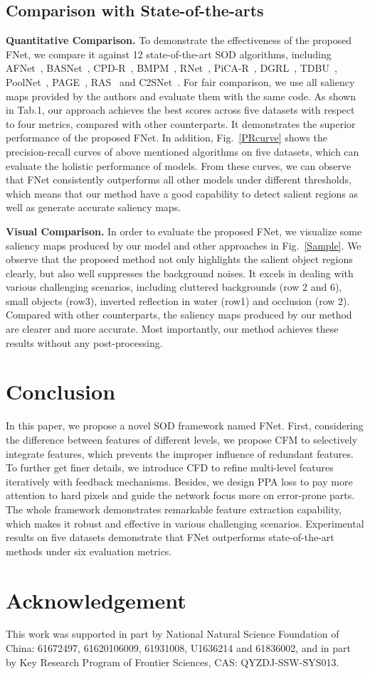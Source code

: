 \documentclass[letterpaper]{article} \usepackage{aaai20}  \usepackage{times}  \usepackage{helvet} \usepackage{courier}  \usepackage[hyphens]{url}  \usepackage{graphicx} \urlstyle{rm} \def\UrlFont{\rm}  \usepackage{graphicx}  \frenchspacing  \setlength{\pdfpagewidth}{8.5in}  \setlength{\pdfpageheight}{11in}
\begin{document}
\subsection{Comparison with State-of-the-arts}
\textbf{Quantitative Comparison.}
To demonstrate the effectiveness of the proposed FNet, we compare it against 12 state-of-the-art SOD algorithms, including AFNet~\cite{AFNet}, BASNet~\cite{BASNet}, CPD-R~\cite{CPD}, BMPM~\cite{BMPM}, RNet~\cite{R3Net}, PiCA-R~\cite{PiCANet}, DGRL~\cite{DGRL}, TDBU~\cite{TDBU}, PoolNet~\cite{PoolNet}, PAGE~\cite{PAGE}, RAS~\cite{RAS} and C2SNet~\cite{C2SNet}. For fair comparison, we use all saliency maps provided by the authors and evaluate them with the same code. As shown in Tab.1, our approach achieves the best scores across five datasets with respect to four metrics, compared with other counterparts. It demonstrates the superior performance of the proposed FNet. In addition, Fig.~\ref{PRcurve} shows the precision-recall curves of above mentioned algorithms on five datasets, which can evaluate the holistic performance of models. From these curves, we can observe that FNet consistently outperforms all other models under different thresholds, which means that our method have a good capability to detect salient regions as well as generate accurate saliency maps.

\textbf{Visual Comparison.}
In order to evaluate the proposed FNet, we visualize some saliency maps produced by our model and other approaches in Fig.~\ref{Sample}. We observe that the proposed method not only highlights the salient object regions clearly, but also well suppresses the background noises. It excels in dealing with various challenging scenarios, including cluttered backgrounds (row 2 and 6), small objects (row3), inverted reflection in water (row1) and occlusion (row 2). Compared with other counterparts, the saliency maps produced by our method are clearer and more accurate. Most importantly, our method achieves these results without any post-processing.

\section{Conclusion}
In this paper, we propose a novel SOD framework named FNet. First, considering the difference between features of different levels, we propose CFM to selectively integrate features, which prevents the improper influence of redundant features. To further get finer details, we introduce CFD to refine multi-level features iteratively with feedback mechanisms. Besides, we design PPA loss to pay more attention to hard pixels and guide the network focus more on error-prone parts. The whole framework demonstrates remarkable feature extraction capability, which makes it robust and effective in various challenging scenarios. Experimental results on five datasets demonstrate that FNet outperforms state-of-the-art methods under six evaluation metrics.

\section{Acknowledgement}
This work was supported in part by National Natural Science Foundation of China: 61672497, 61620106009, 61931008, U1636214 and 61836002, and in part by Key Research Program of Frontier Sciences, CAS: QYZDJ-SSW-SYS013.



\end{document}
